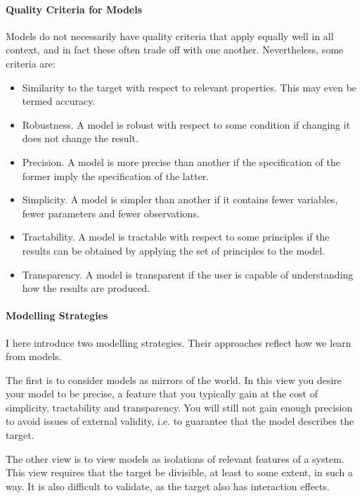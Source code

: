 \paragraph{Quality Criteria for Models}
Models do not necessarily have quality criteria that apply equally well in all context, and in fact these often trade off with one another. Nevertheless, some criteria are:
\begin{itemize}
	\item Similarity to the target with respect to relevant properties. This may even be termed accuracy.
	\item Robustness. A model is robust with respect to some condition if changing it does not change the result.
	\item Precision. A model is more precise than another if the specification of the former imply the specification of the latter.
	\item Simplicity. A model is simpler than another if it contains fewer variables, fewer parameters and fewer observations.
	\item Tractability. A model is tractable with respect to some principles if the results can be obtained by applying the set of principles to the model.
	\item Transparency. A model is transparent if the user is capable of understanding how the results are produced.
\end{itemize}

\paragraph{Modelling Strategies}
I here introduce two modelling strategies. Their approaches reflect how we learn from models.

The first is to consider models as mirrors of the world. In this view you desire your model to be precise, a feature that you typically gain at the cost of simplicity, tractability and transparency. You will still not gain enough precision to avoid issues of external validity, i.e. to guarantee that the model describes the target.

The other view is to view models as isolations of relevant features of a system. This view requires that the target be divisible, at least to some extent, in such a way. It is also difficult to validate, as the target also has interaction effects.